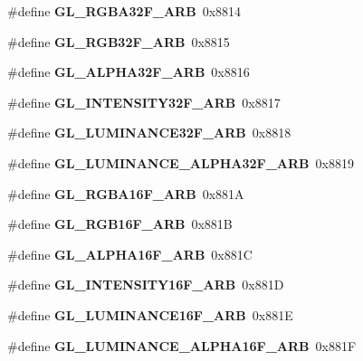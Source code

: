 \begin{DoxyCompactItemize}
\item 
\#define {\bfseries G\+L\+\_\+\+R\+G\+B\+A32\+F\+\_\+\+A\+R\+B}~0x8814\label{_s_d_l__opengl_8h_a3d25eb63c2737538513f7b6d7d6a051e}

\item 
\#define {\bfseries G\+L\+\_\+\+R\+G\+B32\+F\+\_\+\+A\+R\+B}~0x8815\label{_s_d_l__opengl_8h_a29fc11f4eadee777054a0acc314fbabb}

\item 
\#define {\bfseries G\+L\+\_\+\+A\+L\+P\+H\+A32\+F\+\_\+\+A\+R\+B}~0x8816\label{_s_d_l__opengl_8h_a7fe1498cab0f571b33c45784948f6656}

\item 
\#define {\bfseries G\+L\+\_\+\+I\+N\+T\+E\+N\+S\+I\+T\+Y32\+F\+\_\+\+A\+R\+B}~0x8817\label{_s_d_l__opengl_8h_ae1b800cc82e2cbf329dfbebe41f3dce9}

\item 
\#define {\bfseries G\+L\+\_\+\+L\+U\+M\+I\+N\+A\+N\+C\+E32\+F\+\_\+\+A\+R\+B}~0x8818\label{_s_d_l__opengl_8h_a33ba6a053a7de364352204dc9a2dc0d4}

\item 
\#define {\bfseries G\+L\+\_\+\+L\+U\+M\+I\+N\+A\+N\+C\+E\+\_\+\+A\+L\+P\+H\+A32\+F\+\_\+\+A\+R\+B}~0x8819\label{_s_d_l__opengl_8h_a1fb1f84c9be7b4cf74fb292f8c6ab6d9}

\item 
\#define {\bfseries G\+L\+\_\+\+R\+G\+B\+A16\+F\+\_\+\+A\+R\+B}~0x881\+A\label{_s_d_l__opengl_8h_a1d69388cec3ce265e2f930a9c7e301ac}

\item 
\#define {\bfseries G\+L\+\_\+\+R\+G\+B16\+F\+\_\+\+A\+R\+B}~0x881\+B\label{_s_d_l__opengl_8h_ab34cb055682a1d0e64279bd6ca903b3b}

\item 
\#define {\bfseries G\+L\+\_\+\+A\+L\+P\+H\+A16\+F\+\_\+\+A\+R\+B}~0x881\+C\label{_s_d_l__opengl_8h_a310fadd77b050c6165b6fcb049d3c453}

\item 
\#define {\bfseries G\+L\+\_\+\+I\+N\+T\+E\+N\+S\+I\+T\+Y16\+F\+\_\+\+A\+R\+B}~0x881\+D\label{_s_d_l__opengl_8h_af7197b53e101d8dd3a6d5fceb2f630d0}

\item 
\#define {\bfseries G\+L\+\_\+\+L\+U\+M\+I\+N\+A\+N\+C\+E16\+F\+\_\+\+A\+R\+B}~0x881\+E\label{_s_d_l__opengl_8h_ab79b1e21bd4be95824b40330a306cda6}

\item 
\#define {\bfseries G\+L\+\_\+\+L\+U\+M\+I\+N\+A\+N\+C\+E\+\_\+\+A\+L\+P\+H\+A16\+F\+\_\+\+A\+R\+B}~0x881\+F\label{_s_d_l__opengl_8h_a25b310abccb0a2787dad339bb157e5c8}


\end{DoxyCompactItemize}
